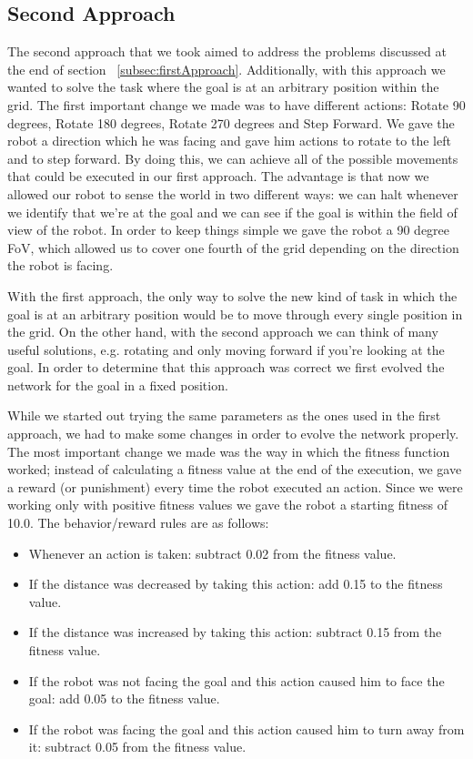 \documentclass[12pt,a4paper,twocolumn]{article}
\begin{document}
\subsection{Second Approach}
The second approach that we took aimed to address the problems discussed at the end of section ~\ref{subsec:firstApproach}. Additionally, with this approach we wanted to solve the task where the goal is at an arbitrary position within the grid. The first important change we made was to have different actions: Rotate 90 degrees, Rotate 180 degrees, Rotate 270 degrees and Step Forward. We gave the robot a direction which he was facing and gave him actions to rotate to the left and to step forward. By doing this, we can achieve all of the possible movements that could be executed in our first approach. The advantage is that now we allowed our robot to sense the world in two different ways: we can halt whenever we identify that we're at the goal and we can see if the goal is within the field of view of the robot. In order to keep things simple we gave the robot a 90 degree FoV, which allowed us to cover one fourth of the grid depending on the direction the robot is facing. 

With the first approach, the only way to solve the new kind of task in which the goal is at an arbitrary position would be to move through every single position in the grid. On the other hand, with the second approach we can think of many useful solutions, e.g. rotating and only moving forward if you're looking at the goal. In order to determine that this approach was correct we first evolved the network for the goal in a fixed position.

While we started out trying the same parameters as the ones used in the first approach, we had to make some changes in order to evolve the network properly. The most important change we made was the way in which the fitness function worked; instead of calculating a fitness value at the end of the execution, we gave a reward (or punishment) every time the robot executed an action. Since we were working only with positive fitness values we gave the robot a starting fitness of 10.0. The behavior/reward rules are as follows:
\begin{itemize}
\item Whenever an action is taken: subtract 0.02 from the fitness value.
\item If the distance was decreased by taking this action: add 0.15 to the fitness value.
\item If the distance was increased by taking this action: subtract 0.15 from the fitness value.
\item If the robot was not facing the goal and this action caused him to face the goal: add 0.05 to the fitness value.
\item If the robot was facing the goal and this action caused him to turn away from it: subtract 0.05 from the fitness value.
\end{itemize}
\end{document}
